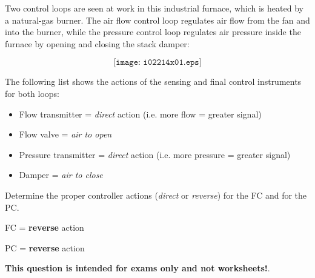 

Two control loops are seen at work in this industrial furnace, which is heated by a natural-gas burner.  The air flow control loop regulates air flow from the fan and into the burner, while the pressure control loop regulates air pressure inside the furnace by opening and closing the stack damper:

$$\texttt{[image: i02214x01.eps]}$$

The following list shows the actions of the sensing and final control instruments for both loops:

\begin{itemize}
\item{} Flow transmitter = {\it direct} action (i.e. more flow = greater signal)
\item{} Flow valve = {\it air to open} 
\item{} Pressure transmitter = {\it direct} action (i.e. more pressure = greater signal)
\item{} Damper = {\it air to close}
\end{itemize}

Determine the proper controller actions ({\it direct} or {\it reverse}) for the FC and for the PC.







FC = {\bf reverse} action

PC = {\bf reverse} action







{\bf This question is intended for exams only and not worksheets!}.



